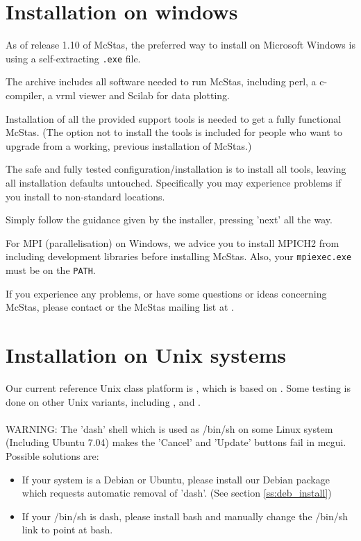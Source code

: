 \section{Installation on windows}
\label{s:win32_install}
As of release 1.10 of McStas, the preferred way to install on
Microsoft Windows is using a self-extracting \texttt{.exe} file.

\noindent The archive includes all software needed to run McStas, including perl, a
c-compiler, a vrml viewer and Scilab for data plotting.

\noindent Installation of all the provided support tools is needed to get a fully
functional McStas. (The option not to install the tools is included for people who want to
upgrade from a working, previous installation of McStas.)

\noindent The safe and fully tested configuration/installation is to install all
tools, leaving all installation defaults untouched. Specifically you
may experience problems if you install to non-standard locations.

\noindent Simply follow the guidance given by the installer, pressing 'next' all
the way.



\noindent For MPI (parallelisation) on Windows, we advice you to install MPICH2 from  including development libraries before installing McStas. Also, your \verb+mpiexec.exe+ must be on the \verb+PATH+.



\noindent If you experience any problems, or have some questions or ideas
concerning McStas, please contact
or the McStas mailing list at .


\section{Installation on Unix systems}
\label{s:unix_install}
Our current reference Unix class platform is
, which is
based on . Some testing is done on other
Unix variants, including ,
and .
\ \\\ \\
 WARNING: The 'dash' shell which is used as /bin/sh on some Linux system (Including Ubuntu 7.04) makes the 'Cancel' and 'Update'
  buttons fail in mcgui. Possible solutions are:
\begin{itemize}
 \item If your system is a Debian or Ubuntu, please install our Debian package which requests automatic removal of 'dash'. (See section \ref{ss:deb_install})
 \item If your /bin/sh is dash, please install bash and manually change the /bin/sh link to point at bash.
\end{itemize}

